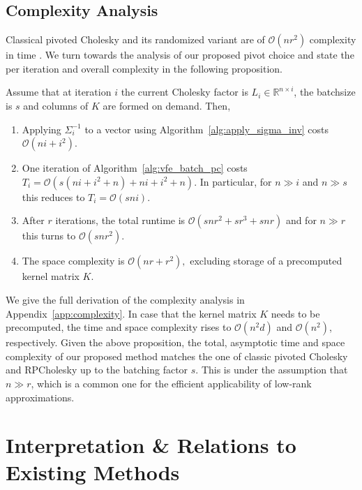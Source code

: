 \documentclass[onefignum,onetabnum]{siamart250211}
\newcommand{\R}{\mathbb{R}}
\begin{document}
\subsection{Complexity Analysis}\label{subsec:complexity}
Classical pivoted Cholesky and its randomized variant are of $\mathcal{O}(nr^2)$ complexity in time \cite{chen.2025, epperly.2025, harbrecht.2012}. We turn towards the analysis of our proposed pivot choice and state the per iteration and overall complexity in the following proposition.
\begin{proposition}
    \label{prop:complexity}
    Assume that at iteration $i$ the current Cholesky factor is $L_i \in \R^{n\times i}$, the batchsize is $s$ and columns of $K$ are formed on demand. Then,
    \begin{enumerate}
        \item[(i)] Applying $\Sigma_i^{-1}$ to a vector using Algorithm~\ref{alg:apply_sigma_inv} costs $\mathcal{O}(ni + i^2)$.
        \item[(ii)] One iteration of Algorithm~\ref{alg:vfe_batch_pc} costs $T_i = \mathcal{O}\left(s(ni+i^2+n) + ni + i^2 + n\right).$
        In particular, for $n \gg i$ and $n \gg s$ this reduces to $T_i = \mathcal{O}(sni)$.
        \item[(iii)] After $r$ iterations, the total runtime is $\mathcal{O}(snr^2 + sr^3 + snr)$
        and for $n \gg r$ this turns to $\mathcal{O}(snr^2)$.
        \item[(iv)] The space complexity is $\mathcal{O}(nr + r^2),$ excluding storage of a precomputed kernel matrix $K$.
    \end{enumerate}
\end{proposition}
We give the full derivation of the complexity analysis in Appendix~\ref{app:complexity}. In case that the kernel matrix $K$ needs to be precomputed, the time and space complexity rises to $\mathcal{O}(n^2d)$ and $\mathcal{O}(n^2)$, respectively. Given the above proposition, the total, asymptotic time and space complexity of our proposed method matches the one of classic pivoted Cholesky and RPCholesky up to the batching factor $s$. This is under the assumption that $n \gg r$, which is a common one for the efficient applicability of low-rank approximations.


\section{Interpretation \& Relations to Existing Methods}\label{sec:interpretation}
\end{document}
